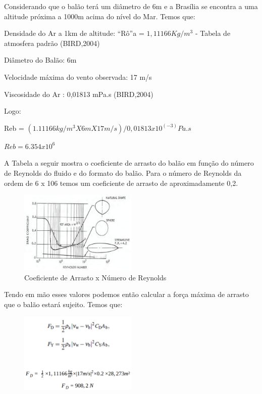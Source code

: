 	Considerando que o balão terá um diâmetro de 6m e a Brasília se encontra a uma altitude próxima a 1000m acima do nível do Mar. Temos que:

	Densidade do Ar a 1km de altitude: “Rô”a = $1,11166 Kg/m^3$ - Tabela de atmosfera padrão  (BIRD,2004) 

	Diâmetro do Balão: 6m
	
	Velocidade máxima do vento observada: 17 m/s
	
	Viscosidade do Ar : 0,01813 mPa.s (BIRD,2004)
	
	Logo:	

	Reb = $(1.11166 kg/m^3 X 6m X 17 m/s) / 0,01813 x 10^(-3) Pa.s$
	
	$Reb = 6.354 x 10^6$

	A Tabela a seguir mostra o coeficiente de arrasto do balão em função do número de Reynolds do fluido e do formato do balão. Para o número de Reynolds da ordem de 6 x 106  temos um coeficiente de arrasto de aproximadamente 0,2. 

	\begin{figure}[H]
		\centering
		\includegraphics[width=0.5\textwidth]{figuras/coeficienteArrasto}
		\caption{Coeficiente de Arrasto x Número de Reynolds}
		\label{img:coeficienteArrasto}
	\end{figure}

	Tendo em mão esses valores podemos então calcular a força máxima de arrasto que o balão estará sujeito. Temos que:

	\begin{figure}[H]
		\centering
		\includegraphics[width=0.5\textwidth]{figuras/formulasCoeficienteArrasto}
		\caption{}
		\label{img:formulasCoeficienteArrasto}
	\end{figure}


